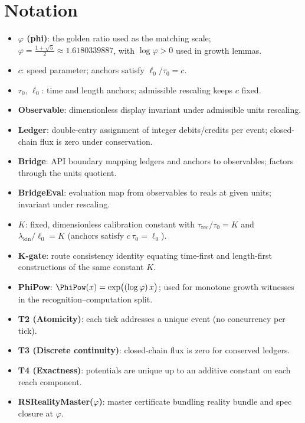 \documentclass[11pt,a4paper,twoside]{article}
\numberwithin{equation}{section}
\theoremstyle{customthm}
\theoremstyle{customdef}
\theoremstyle{customrem}
\begin{document}
\section*{Notation}\label{sec:notation}
\begin{itemize}[leftmargin=*]
  \item \textbf{$\varphi$ (phi)}: the golden ratio used as the matching scale; $\displaystyle \varphi = \tfrac{1+\sqrt{5}}{2} \approx 1.6180339887$, with $\log \varphi > 0$ used in growth lemmas.
  \item \textbf{$c$}: speed parameter; anchors satisfy $\ell_0/\tau_0 = c$.
  \item \textbf{$\tau_0,\,\ell_0$}: time and length anchors; admissible rescaling keeps $c$ fixed.
  \item \textbf{Observable}: dimensionless display invariant under admissible units rescaling.
  \item \textbf{Ledger}: double-entry assignment of integer debits/credits per event; closed-chain flux is zero under conservation.
  \item \textbf{Bridge}: API boundary mapping ledgers and anchors to observables; factors through the units quotient.
  \item \textbf{BridgeEval}: evaluation map from observables to reals at given units; invariant under rescaling.
  \item \textbf{$K$}: fixed, dimensionless calibration constant with $\tau_{\mathrm{rec}}/\tau_0 = K$ and $\lambda_{\mathrm{kin}}/\ell_0 = K$ (anchors satisfy $c\,\tau_0=\ell_0$).
  \item \textbf{K-gate}: route consistency identity equating time-first and length-first constructions of the same constant $K$.
  \item \textbf{PhiPow}: $\PhiPow(x) = \exp\!\big((\log\varphi)\,x\big)$; used for monotone growth witnesses in the recognition–computation split.
  \item \textbf{T2 (Atomicity)}: each tick addresses a unique event (no concurrency per tick).
  \item \textbf{T3 (Discrete continuity)}: closed-chain flux is zero for conserved ledgers.
  \item \textbf{T4 (Exactness)}: potentials are unique up to an additive constant on each reach component.
  \item \textbf{RSRealityMaster($\varphi$)}: master certificate bundling reality bundle and spec closure at $\varphi$.
\end{itemize}
\end{document}
